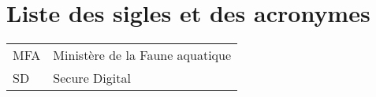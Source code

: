 
%
%


\chapter{Liste des sigles et des acronymes}


\begin{flushleft}
   \begin{tabular}{@{}ll}
		MFA			& Ministère de la Faune aquatique					\\
		SD			& Secure Digital
   \end{tabular}
\end{flushleft}

